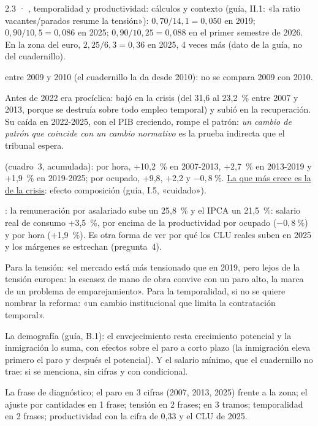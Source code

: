 \begin{complemento}{2.3 · , temporalidad y productividad: cálculos y contexto}
 (guía, II.1: «la ratio vacantes/parados resume la tensión»): $0{,}70/14{,}1=0{,}050$ en 2019; $0{,}90/10{,}5=0{,}086$ en 2025; $0{,}90/10{,}25=0{,}088$ en el primer semestre de 2026. En la zona del euro, $2{,}25/6{,}3=0{,}36$ en 2025, 4 veces más \parencite{Eurostat2026jvs} (dato de la guía, no del cuadernillo).

 entre 2009 y 2010 (el cuadernillo la da desde 2010): no se compara 2009 con 2010.

 Antes de 2022 era procíclica: bajó en la crisis (del 31,6 al 23,2~\% entre 2007 y 2013, porque se destruía sobre todo empleo temporal) y subió en la recuperación. Su caída en 2022-2025, con el PIB creciendo, rompe el patrón: \emph{un cambio de patrón que coincide con un cambio normativo} es la prueba indirecta que el tribunal espera.

 (cuadro~3, acumulada): por hora, +10,2~\% en 2007-2013, +2,7~\% en 2013-2019 y +1,9~\% en 2019-2025; por ocupado, +9,8, +2,2 y $-0{,}8~\%$. \uline{La que más crece es la de la crisis}: efecto composición (guía, I.5, «cuidado»).

: la remuneración por asalariado sube un 25,8~\% y el IPCA un 21,5~\%: salario real de consumo +3,5~\%, por encima de la productividad por ocupado ($-0{,}8~\%$) y por hora (+1,9~\%). Es otra forma de ver por qué los CLU reales suben en 2025 y los márgenes se estrechan (pregunta~4).

 Para la tensión: «el mercado está más tensionado que en 2019, pero lejos de la tensión europea: la escasez de mano de obra convive con un paro alto, la marca de un problema de emparejamiento». Para la temporalidad, si no se quiere nombrar la reforma: «un cambio institucional que limita la contratación temporal».

 La demografía (guía, B.1): el envejecimiento resta crecimiento potencial y la inmigración lo suma, con efectos sobre el paro a corto plazo (la inmigración eleva primero el paro y después el potencial). Y el salario mínimo, que el cuadernillo no trae: si se menciona, sin cifras y con condicional.

 La frase de diagnóstico; el paro en 3 cifras (2007, 2013, 2025) frente a la zona; el ajuste por cantidades en 1 frase; tensión en 2 frases;  en 3 tramos; temporalidad en 2 frases; productividad con la cifra de 0,33 y el CLU de 2025.
\end{complemento}

